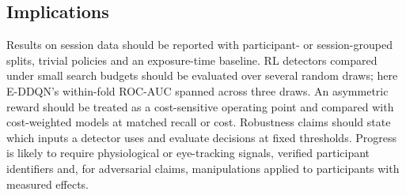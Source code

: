 \subsection{Implications}
Results on session data should be reported with participant- or session-grouped splits, trivial policies and an exposure-time baseline. RL detectors compared under small search budgets should be evaluated over several random draws; here E-DDQN's within-fold ROC-AUC spanned \SDWfSpan{} across three draws. An asymmetric reward should be treated as a cost-sensitive operating point and compared with cost-weighted models at matched recall or cost. Robustness claims should state which inputs a detector uses and evaluate decisions at fixed thresholds. Progress is likely to require physiological or eye-tracking signals, verified participant identifiers and, for adversarial claims, manipulations applied to participants with measured effects.
